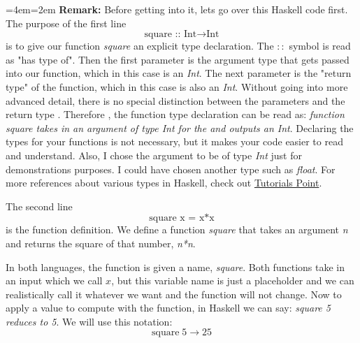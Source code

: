 \documentclass{article}
\newenvironment{blockquote}{%
  \par%
  \medskip
  \leftskip=4em\rightskip=2em%
  \noindent\ignorespaces}{%
  \par\medskip}
\begin{document}
\begin{blockquote}
\medskip\noindent
\textbf{Remark:} Before getting into it, lets go over this Haskell code first. The purpose of the first line $$\textrm{square :: Int} \rightarrow \textrm{Int}$$ is to give our function \textit{square} an explicit type declaration. The $::$ symbol is read as "has type of". Then the first parameter is the argument type that gets passed into our function, which in this case is an \textit{Int}. The next parameter is the "return type" of the function, which in this case is also an \textit{Int}. Without going into more advanced detail, there is no special distinction between the parameters and the return type \cite{LYAH}. Therefore , the function type declaration can be read as: \textit{function square takes in an argument of type Int for the and outputs an Int}. Declaring the types for your functions is not necessary, but it makes your code easier to read and understand. Also, I chose the argument to be of type \textit{Int} just for demonstrations purposes. I could have chosen another type such as \textit{float}. For more references about various types in Haskell, check out \href{https://www.tutorialspoint.com/haskell/haskell_types_and_type_class.htm}{Tutorials Point}. 

\medskip\noindent
The second line  $$\textrm{square x = x*x}$$ is the function definition. We define a function \textit{square} that takes an argument \textit{n} and returns the square of that number, \textit{n*n}.

\end{blockquote}
\medskip\noindent
In both languages, the function is given a name, \textit{square}. Both functions take in an input which we call $x$, but this variable name is just a placeholder and we can realistically call it whatever we want and the function will not change.
\medskip\noindent
Now to apply a value to compute with the function, in Haskell we can say: \textit{square 5 reduces to 5}. We will use this notation: $$\textrm{square}\;5 \rightarrow 25$$
\end{document}
